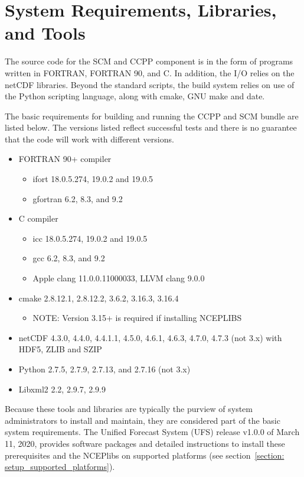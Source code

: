 \section{System Requirements, Libraries, and Tools}
\label{section: systemrequirements}

The source code for the SCM and CCPP component is in the form of programs written in FORTRAN, FORTRAN 90, and C. In addition, the I/O relies on the netCDF libraries. Beyond the standard scripts, the build system relies on use of the Python scripting language, along with cmake, GNU make and date.

The basic requirements for building and running the CCPP and SCM bundle are listed below. The versions listed reflect successful tests and there is no guarantee that the code will work with different versions.
\begin{itemize}
    \item FORTRAN 90+ compiler
    	\begin{itemize}
   	 \item ifort 18.0.5.274, 19.0.2 and 19.0.5
	 \item gfortran 6.2, 8.3, and 9.2
	 \end{itemize}
    \item C compiler
    	\begin{itemize}
	\item icc 18.0.5.274, 19.0.2 and 19.0.5
	\item gcc 6.2, 8.3, and 9.2
	\item Apple clang 11.0.0.11000033, LLVM clang 9.0.0
	\end{itemize}
    \item cmake 2.8.12.1, 2.8.12.2, 3.6.2, 3.16.3, 3.16.4
    	\begin{itemize}
	\item NOTE: Version 3.15+ is required if installing NCEPLIBS
	\end{itemize}
   	 \item netCDF 4.3.0, 4.4.0, 4.4.1.1, 4.5.0, 4.6.1, 4.6.3, 4.7.0, 4.7.3 (not 3.x) with HDF5, ZLIB and SZIP
    \item Python 2.7.5, 2.7.9, 2.7.13, and 2.7.16 (not 3.x)
    \item Libxml2 2.2, 2.9.7, 2.9.9
\end{itemize}

Because these tools and libraries are typically the purview of system administrators to install and maintain, they are considered  part of the basic system requirements. The Unified Forecast System (UFS) release v1.0.0 of March 11, 2020, provides software packages and detailed instructions to install these prerequisites and the NCEPlibs on supported platforms (see section~\ref{section: setup_supported_platforms}).

